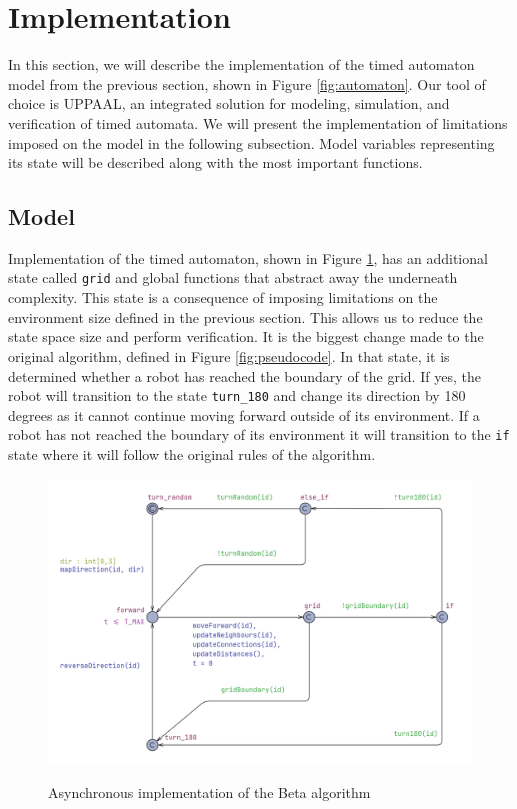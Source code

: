 \section{Implementation}
In this section, we will describe the implementation of the timed automaton model from the previous section, shown in Figure \ref{fig:automaton}. Our tool of choice is UPPAAL, an integrated solution for modeling, simulation, and verification of timed automata. We will present the implementation of limitations imposed on the model in the following subsection.  Model variables representing its state will be described along with the most important functions.


\subsection{Model}
Implementation of the timed automaton, shown in Figure \ref{fig:implementation}, has an additional state called \texttt{grid} and global functions that abstract away the underneath complexity. This state is a consequence of imposing limitations on the environment size defined in the previous section. This allows us to reduce the state space size and perform verification. It is the biggest change made to the original algorithm, defined in Figure \ref{fig:pseudocode}. In that state, it is determined whether a robot has reached the boundary of the grid. If yes, the robot will transition to the state \texttt{turn\_180} and change its direction by 180 degrees as it cannot continue moving forward outside of its environment. If a robot has not reached the boundary of its environment it will transition to the \texttt{if} state where it will follow the original rules of the algorithm.

\begin{figure}[H]
\caption{Asynchronous implementation of the Beta algorithm}
\includegraphics[width=\textwidth]{images/implementation.png}
\label{fig:implementation}
\end{figure}

